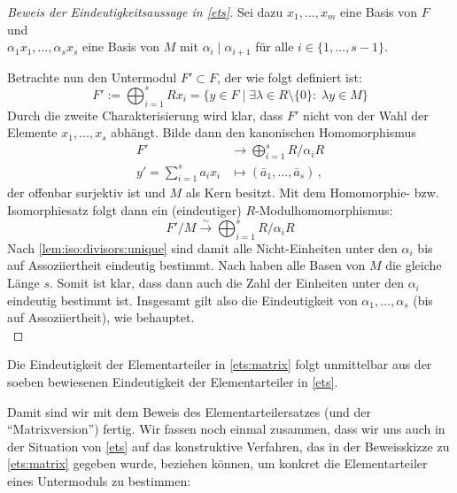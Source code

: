 \begin{proof}[Beweis der Eindeutigkeitsaussage in \cref{ets}]
    Sei dazu $x_1,\ldots,x_m$ eine Basis von $F$ und\\
    $\alpha_1 x_1,\ldots,\alpha_s x_s$ eine Basis von $M$ mit
    $\alpha_i\mid\alpha_{i+1}$ für alle $i\in\{1,\ldots,s-1\}$.
    
    Betrachte nun den Untermodul $F'\subset F$, der wie folgt definiert ist:
    \[ F' := \bigoplus_{i=1}^s Rx_i 
        = \bigl\{ y\in F \;\big\vert\; \exists \lambda\in R\setminus\!\{0\}\colon
        \; \lambda y \in M \bigr\}  \]
    Durch die zweite Charakterisierung wird klar, dass $F'$ nicht von der Wahl
    der Elemente $x_1,\ldots,x_s$ abhängt.
    Bilde dann den kanonischen Homomorphismus
    \begin{align*}
        F' &\to \bigoplus_{i=1}^s R/\alpha_i R      \\
        y' = \sum_{i=1}^s a_ix_i &\mapsto (\bar{a}_1,\ldots,\bar{a}_s) \,,
    \end{align*}
    der offenbar surjektiv ist und $M$ als Kern besitzt. 
    Mit dem Homomorphie- bzw. Isomorphiesatz \cite[5.2]{talk:markl}
    folgt dann ein (eindeutiger) $R$-Modulhomomorphismus:
    \[ F'/M \overset\sim\to \bigoplus_{i=1}^s R/\alpha_i R \]
    Nach \cref{lem:iso:divisors:unique}
    sind damit alle Nicht-Einheiten unter den $\alpha_i$ bis auf Assoziiertheit 
    eindeutig bestimmt. Nach \cite[3.6]{talk:stad}
    haben alle Basen von $M$ die gleiche Länge $s$. Somit ist klar, dass dann
    auch die Zahl der Einheiten unter den $\alpha_i$ eindeutig bestimmt ist.
    Insgesamt gilt also die Eindeutigkeit von $\alpha_1,\ldots,\alpha_s$ (bis
    auf Assoziiertheit), wie behauptet.
    \\
\end{proof}

\begin{thKorollar}
    Die Eindeutigkeit der Elementarteiler in \cref{ets:matrix}
    folgt unmittelbar aus der soeben bewiesenen Eindeutigkeit der
    Elementarteiler in \cref{ets}.
\end{thKorollar}

Damit sind wir mit dem Beweis des Elementarteilersatzes (und der
\enquote{Matrixversion}) fertig. Wir fassen noch einmal zusammen, dass wir uns
auch in der Situation von \cref{ets} auf das konstruktive Verfahren, das in der
Beweisskizze zu \cref{ets:matrix} gegeben wurde, beziehen können, um konkret die
Elementarteiler eines Untermoduls zu bestimmen:

